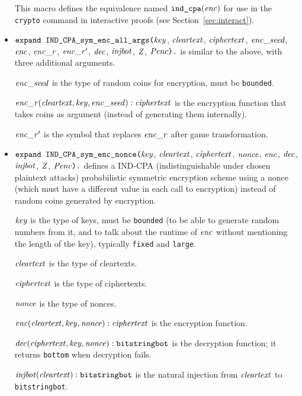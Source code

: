 \documentclass{article}
\begin{document}
\begin{itemize}
   This macro defines the equivalence named $\texttt{ind\_cpa}(\mathit{enc})$
   for use in the \texttt{crypto} command in interactive proofs
   (see Section~\ref{sec:interact}).

\item $\texttt{expand IND\_CPA\_sym\_enc\_all\_args(}\mathit{key}$,
  $\mathit{cleartext}$, $\mathit{ciphertext}$, $\mathit{enc\_seed}$, $\mathit{enc}$, $\mathit{enc\_r}$, $\mathit{enc\_r}'$,
  $\mathit{dec}$, $\mathit{injbot}$, $\mathit{Z}$, $\mathit{Penc}\texttt{).}$ is similar to the above,
  with three additional arguments. 

  $\mathit{enc\_seed}$ is the type of random coins for encryption, must be \texttt{bounded}.

  $\mathit{enc\_r}(\mathit{cleartext}, \mathit{key}, \mathit{enc\_seed}): \mathit{ciphertext}$ is the encryption function that takes coins as argument (instead of generating them internally).

  $\mathit{enc\_r}'$ is the symbol that replaces $\mathit{enc\_r}$ after game transformation.

\item $\texttt{expand IND\_CPA\_sym\_enc\_nonce(}\mathit{key}$,
  $\mathit{cleartext}$, $\mathit{ciphertext}$, $\mathit{nonce}$, $\mathit{enc}$,
  $\mathit{dec}$, $\mathit{injbot}$, $\mathit{Z}$, $\mathit{Penc}\texttt{).}$ defines a
  IND-CPA (indistinguishable under chosen plaintext attacks)
  probabilistic symmetric encryption scheme using a nonce 
   (which must have a different value in each call to encryption)
   instead of random coins generated by encryption.

   $\mathit{key}$ is the type of keys, must be \texttt{bounded} (to be able to generate random numbers from it, and to talk about the runtime of $\mathit{enc}$ without mentioning the length of the key), typically \texttt{fixed} and \texttt{large}.

   $\mathit{cleartext}$ is the type of cleartexts.

   $\mathit{ciphertext}$ is the type of ciphertexts.

   $\mathit{nonce}$ is the type of nonces.

   $\mathit{enc}(\mathit{cleartext}, \mathit{key}, \mathit{nonce}): \mathit{ciphertext}$ is the encryption function. 

   $\mathit{dec}(\mathit{ciphertext}, \mathit{key}, \mathit{nonce}): \texttt{bitstringbot}$ is the
  decryption function; it returns \texttt{bottom} when decryption
  fails.

   $\mathit{injbot}(\mathit{cleartext}): \texttt{bitstringbot}$ is the natural
  injection from $\mathit{cleartext}$ to \texttt{bitstringbot}.


\end{itemize}
\end{document}
